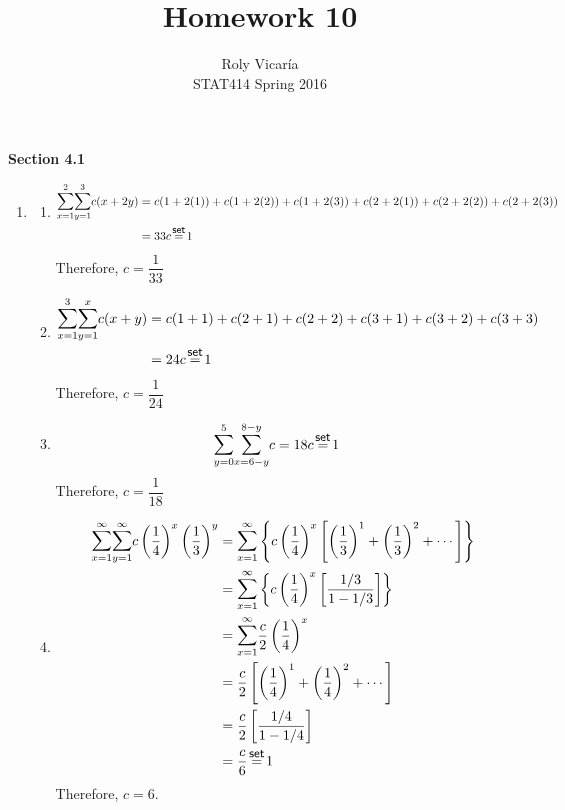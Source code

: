 \documentclass{article}
\title{Homework 10}
\author{Roly Vicar\'ia \\ STAT414 Spring 2016}
\newcommand\seteq{\mathrel{\overset{\makebox[0pt]{\mbox{\normalfont\small\sffamily set}}}{=}}}
\newcommand\mfrac[2]{\left(\dfrac{#1}{#2}\right)}
\begin{document}
    
    \maketitle
    
    \textbf{Section 4.1}
    \begin{enumerate}
     \item 
      \begin{enumerate}
       \item 
	\begin{align*}
	  \mathlarger{\sum}_{x=1}^2 \mathlarger{\sum}_{y=1}^3 {c(x+2y)} 
	    &= c(1+2(1)) + c(1+2(2)) + c(1+2(3)) + c(2+2(1)) + c(2+2(2)) + c(2+2(3)) \\
	    &= 33c \seteq 1
	\end{align*}
	Therefore, $c=\dfrac{1}{33}$
       
       \item
	\begin{align*}
	 \mathlarger{\sum}_{x=1}^3 \mathlarger{\sum}_{y=1}^x {c(x+y)}
	  &= c(1+1) + c(2+1) + c(2+2) + c(3+1) + c(3+2) + c(3+3) \\
	  &= 24c \seteq 1
	\end{align*}
	Therefore, $c = \dfrac{1}{24}$
       
       \item
	\begin{align*}
	 \mathlarger{\sum}_{y=0}^5 \mathlarger{\sum}_{x=6-y}^{8-y} {c}
	  &= 18c \seteq 1
	\end{align*}
	Therefore, $c = \dfrac{1}{18}$
       
       \item
	\begin{align*}
	 \mathlarger{\sum}_{x=1}^\infty \mathlarger{\sum}_{y=1}^\infty 
	    {c\mfrac{1}{4}^x\mfrac{1}{3}^y}
	  &= \mathlarger{\sum}_{x=1}^\infty \left\{c\mfrac{1}{4}^x 
	      \left[\mfrac{1}{3}^1 + \mfrac{1}{3}^2 + \cdots \right] \right\} \\
	  &= \mathlarger{\sum}_{x=1}^\infty \left\{c\mfrac{1}{4}^x 
	      \left[\dfrac{1/3}{1 - 1/3}\right] \right\} \\
	  &= \mathlarger{\sum}_{x=1}^\infty {\dfrac{c}{2}\mfrac{1}{4}^x} \\
	  &= \dfrac{c}{2}\left[\mfrac{1}{4}^1 + \mfrac{1}{4}^2 + \cdots \right] \\
	  &= \dfrac{c}{2} \left[ \dfrac{1/4}{1 - 1/4} \right] \\
	  &= \dfrac{c}{6} \seteq 1
	\end{align*}
	Therefore, $c = 6$.
      \end{enumerate}     
     \addtocounter{enumi}{1}
      

\end{enumerate}
\end{document}
